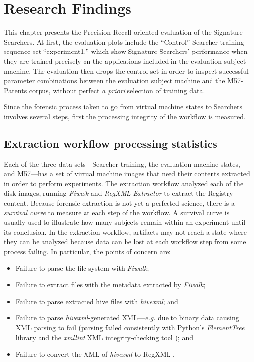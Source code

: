\documentclass[11pt]{ucthesis}
\theoremstyle{plain}
\theoremstyle{definition}
\newcommand{\eg}{\emph{e.g.}\xspace}
\newcommand{\Fiwalk}{\emph{Fiwalk}\xspace}
\newcommand{\hivexml}{\emph{hivexml}\xspace}
\newcommand{\xmllint}{\emph{xmllint}\xspace}
\newcommand{\Regxmlextractor}{\emph{RegXML Extractor}\xspace}
\begin{document}
\chapter{Research Findings}

This chapter presents the Precision-Recall oriented evaluation of the Signature Searchers.  At first, the evaluation plots include the ``Control'' Searcher training sequence-set ``experiment1,'' which show Signature Searchers' performance when they are trained precisely on the applications included in the evaluation subject machine.  The evaluation then drops the control set in order to inspect successful parameter combinations between the evaluation subject machine and the M57-Patents corpus, without perfect \emph{a priori} selection of training data.

Since the forensic process taken to go from virtual machine states to Searchers involves several steps, first the processing integrity of the workflow is measured.


\section{Extraction workflow processing statistics}
\label{sec:procstats}

Each of the three data sets---Searcher training, the evaluation machine states, and M57---has a set of virtual machine images that need their contents extracted in order to perform experiments.  The extraction workflow analyzed each of the disk images, running \Fiwalk and \Regxmlextractor to extract the Registry content.  Because forensic extraction is not yet a perfected science, there is a \emph{survival curve} to measure at each step of the workflow.  A survival curve is usually used to illustrate how many subjects remain within an experiment until its conclusion.  In the extraction workflow, artifacts may not reach a state where they can be analyzed because data can be lost at each workflow step from some process failing.  In particular, the points of concern are:

\begin{itemize}
\item Failure to parse the file system with \Fiwalk \cite{garfinkel:sadfe09};
\item Failure to extract files with the metadata extracted by \Fiwalk;
\item Failure to parse extracted hive files with \hivexml \cite{hivex}; and
\item Failure to parse \hivexml-generated XML---\eg due to binary data causing XML parsing to fail (parsing failed consistently with Python's \emph{ElementTree} library \cite{pythonsf:elementtree} and the \xmllint XML integrity-checking tool \cite{libxml2}); and
\item Failure to convert the XML of \hivexml to RegXML \cite{nelson:ifip12}.
\end{itemize}
\end{document}
